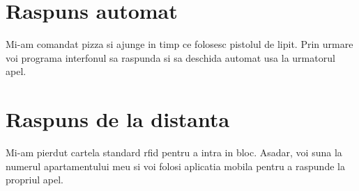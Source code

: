 \section{Raspuns automat}

Mi-am comandat pizza si ajunge in timp ce folosesc pistolul de lipit. Prin urmare voi programa interfonul sa raspunda si sa deschida automat usa la urmatorul apel.

\section{Raspuns de la distanta}

Mi-am pierdut cartela standard \acrfull{rfid} pentru a intra in bloc. Asadar, voi suna la numerul apartamentului meu si voi folosi aplicatia mobila pentru a raspunde la propriul apel.
